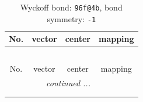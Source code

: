 \documentclass[fleqn,8pt]{jsarticle}
\begin{document}
\renewcommand{\arraystretch}{1.2}
\begin{longtable}{cccc}
\caption{Wyckoff bond: {\tt 96f@4b}, bond symmetry: {\tt -1}}
 \\
 \hline \hline
No. & vector & center & mapping \\ \hline \endfirsthead

\multicolumn{3}{l}{\tablename\ \thetable{}} \\
 \hline \hline
No. & vector & center & mapping \\ \hline \endhead

 \hline \hline
\multicolumn{3}{r}{\footnotesize\it continued ...} \\ \endfoot

 \hline \hline
\multicolumn{3}{r}{} \\ \endlastfoot


\end{longtable}
\end{document}
